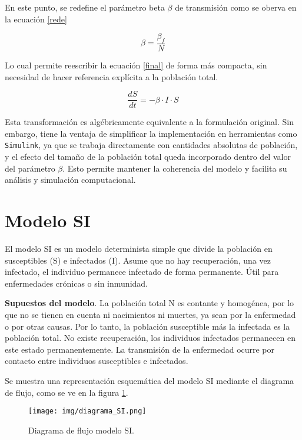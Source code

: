 En este punto, se redefine el parámetro beta $\beta$ de transmisión como se oberva en la ecuación \eqref{rede} 

\begin{equation}
    \beta = \frac{\beta_f}{N}
\label{rede}
\end{equation}

Lo cual permite reescribir la ecuación \eqref{final} de forma más compacta, sin necesidad de hacer referencia explícita a la población total.

\begin{equation}
    \frac{dS}{dt} = -\beta \cdot I \cdot S
\label{final}
\end{equation}

Esta transformación es algébricamente equivalente a la formulación original. Sin embargo, tiene la ventaja de simplificar la implementación en herramientas como \texttt{Simulink}, ya que se trabaja directamente con cantidades absolutas de población, y el efecto del tamaño de la población total queda incorporado dentro del valor del parámetro \( \beta \). Esto permite mantener la coherencia del modelo y facilita su análisis y simulación computacional.





\section{Modelo SI}
El modelo SI es un modelo determinista simple que divide la población en susceptibles (S) e infectados (I). Asume que no hay recuperación, una vez infectado, el individuo permanece infectado de forma permanente. Útil para enfermedades crónicas o sin inmunidad.

\textbf{Supuestos del modelo}. La población total N es contante y homogénea, por lo que no se tienen en cuenta ni nacimientos ni muertes, ya sean por la enfermedad o por otras causas. Por lo tanto, la población susceptible más la infectada es la población total. No existe recuperación, los individuos infectados permanecen en este estado permanentemente. La transmisión de la enfermedad ocurre por contacto entre individuos susceptibles e infectados.

Se muestra una representación esquemática del modelo SI mediante el diagrama de flujo, como se ve en la figura \ref{fig:diagrama SI}.

\begin{figure}[H]
    \centering
    \texttt{[image: img/diagrama\_SI.png]}
    \caption{Diagrama de flujo modelo SI.}
    \label{fig:diagrama SI}
    
\end{figure}

